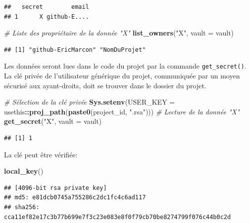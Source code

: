 \documentclass[
  12pt,
  french,
  a4paper,
  extrafontsizes,onecolumn,openright
  ]{memoir}
\newenvironment{Shaded}{\begin{snugshade}}{\end{snugshade}}
\newcommand{\AttributeTok}[1]{\textcolor[rgb]{0.13,0.29,0.53}{#1}}
\newcommand{\CommentTok}[1]{\textcolor[rgb]{0.56,0.35,0.01}{\textit{#1}}}
\newcommand{\FunctionTok}[1]{\textcolor[rgb]{0.13,0.29,0.53}{\textbf{#1}}}
\newcommand{\NormalTok}[1]{#1}
\newcommand{\SpecialCharTok}[1]{\textcolor[rgb]{0.81,0.36,0.00}{\textbf{#1}}}
\newcommand{\StringTok}[1]{\textcolor[rgb]{0.31,0.60,0.02}{#1}}
\begin{document}
\begin{verbatim}
##   secret        email
## 1      X github-E....
\end{verbatim}

\begin{Shaded}
\begin{Highlighting}[]
\CommentTok{\# Liste des propriétaire de la donnée "X"}
\FunctionTok{list\_owners}\NormalTok{(}\StringTok{"X"}\NormalTok{, }\AttributeTok{vault =}\NormalTok{ vault)}
\end{Highlighting}
\end{Shaded}

\begin{verbatim}
## [1] "github-EricMarcon" "NomDuProjet"
\end{verbatim}

\normalsize

Les données seront lues dans le code du projet par la commande \texttt{get\_secret()}.
La clé privée de l'utilisateur générique du projet, communiquée par un moyen sécurisé aux ayant-droits, doit se trouver dans le dossier du projet.

\scriptsize

\begin{Shaded}
\begin{Highlighting}[]
\CommentTok{\# Sélection de la clé privée}
\FunctionTok{Sys.setenv}\NormalTok{(}\AttributeTok{USER\_KEY =}\NormalTok{ usethis}\SpecialCharTok{::}\FunctionTok{proj\_path}\NormalTok{(}\FunctionTok{paste0}\NormalTok{(project\_id, }\StringTok{".rsa"}\NormalTok{)))}
\CommentTok{\# Lecture de la donnée "X"}
\FunctionTok{get\_secret}\NormalTok{(}\StringTok{"X"}\NormalTok{, }\AttributeTok{vault =}\NormalTok{ vault)}
\end{Highlighting}
\end{Shaded}

\begin{verbatim}
## [1] 1
\end{verbatim}

\normalsize

La clé peut être vérifiée:

\scriptsize

\begin{Shaded}
\begin{Highlighting}[]
\FunctionTok{local\_key}\NormalTok{()}
\end{Highlighting}
\end{Shaded}

\begin{verbatim}
## [4096-bit rsa private key]
## md5: e81dcb0745a755286c2dc1fc4c6ad117
## sha256: cca11ef82e17c3b77b699e7f3c23e083e8f0f79cb70be8274799f076c44b0c2d
\end{verbatim}
\end{document}
